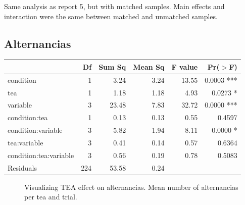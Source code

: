\documentclass{article}
\begin{document}
Same analysis as report 5, but with matched samples. Main effects and interaction were the same between matched and unmatched samples.


\subsection{Alternancias}

\begin{table}[H]
\centering
\begin{tabular}{lrrrrr}
  \hline
 & Df & Sum Sq & Mean Sq & F value & Pr($>$F) \\ 
  \hline
  condition              & 1 & 3.24 & 3.24 & 13.55 & 0.0003 ***\\ 
  tea                    & 1 & 1.18 & 1.18 & 4.93 & 0.0273 *\\ 
  variable               & 3 & 23.48 & 7.83 & 32.72 & 0.0000 ***\\ 
  condition:tea          & 1 & 0.13 & 0.13 & 0.55 & 0.4597 \\ 
  condition:variable     & 3 & 5.82 & 1.94 & 8.11 & 0.0000 *\\ 
  tea:variable           & 3 & 0.41 & 0.14 & 0.57 & 0.6364 \\ 
  condition:tea:variable & 3 & 0.56 & 0.19 & 0.78 & 0.5083 \\ 
  Residuals              & 224 & 53.58 & 0.24 &  &  \\ 
   \hline
\end{tabular}
\end{table}

\begin{figure}[H]
  \caption{Visualizing TEA effect on alternancias. Mean number of alternancias per tea and trial.}
  \noindent{}
  \centering
\end{figure}
\end{document}
